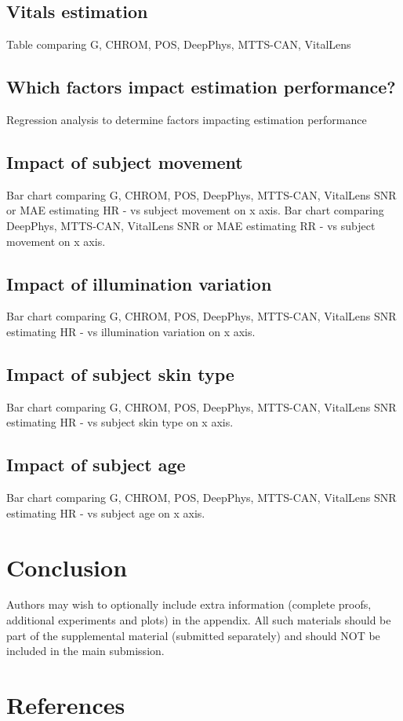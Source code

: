 \documentclass{article}
\begin{document}
\subsection{Vitals estimation}

Table comparing G, CHROM, POS, DeepPhys, MTTS-CAN, VitalLens

\subsection{Which factors impact estimation performance?}

Regression analysis to determine factors impacting estimation performance

\subsection{Impact of subject movement}

Bar chart comparing G, CHROM, POS, DeepPhys, MTTS-CAN, VitalLens SNR or MAE estimating HR - vs subject movement on x axis.
Bar chart comparing DeepPhys, MTTS-CAN, VitalLens SNR or MAE estimating RR - vs subject movement on x axis.

\subsection{Impact of illumination variation}

Bar chart comparing G, CHROM, POS, DeepPhys, MTTS-CAN, VitalLens SNR estimating HR - vs illumination variation on x axis.

\subsection{Impact of subject skin type}

Bar chart comparing G, CHROM, POS, DeepPhys, MTTS-CAN, VitalLens SNR estimating HR - vs subject skin type on x axis.

\subsection{Impact of subject age}

Bar chart comparing G, CHROM, POS, DeepPhys, MTTS-CAN, VitalLens SNR estimating HR - vs subject age on x axis.

\section{Conclusion}
\label{sec:conclusion}

Authors may wish to optionally include extra information (complete proofs, additional experiments and plots) in the appendix. All such materials should be part of the supplemental material (submitted separately) and should NOT be included in the main submission.

\section*{References}




\end{document}
